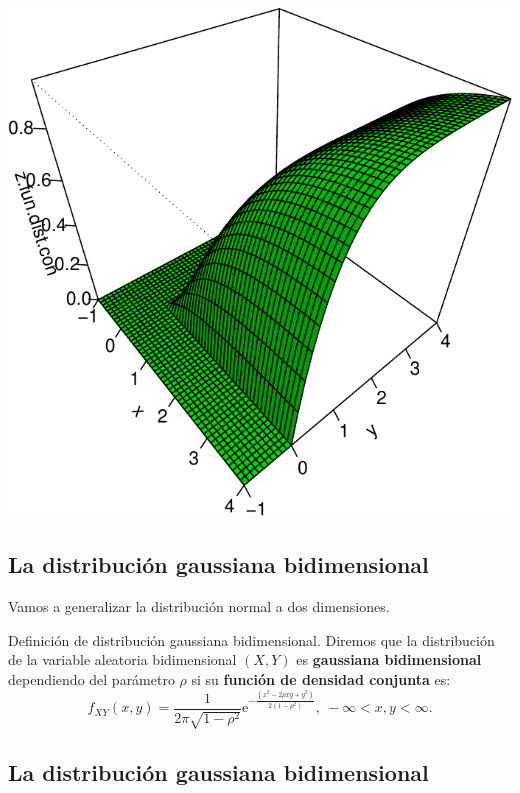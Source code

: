 \documentclass[]{book}
\begin{document}
\begin{center}\includegraphics{curso-probabilidad-udemy_files/figure-latex/unnamed-chunk-137-1} \end{center}

\hypertarget{la-distribuciuxf3n-gaussiana-bidimensional}{%
\subsection{La distribución gaussiana bidimensional}\label{la-distribuciuxf3n-gaussiana-bidimensional}}

Vamos a generalizar la distribución normal a dos dimensiones.

Definición de distribución gaussiana bidimensional.
Diremos que la distribución de la variable aleatoria bidimensional \((X,Y)\) es \textbf{gaussiana bidimensional} dependiendo del parámetro \(\rho\) si su \textbf{función de densidad conjunta} es:
\[
f_{XY}(x,y)=\frac{1}{2\pi\sqrt{1-\rho^2}}\mathrm{e}^{-\frac{(x^2-2\rho xy+y^2)}{2(1-\rho^2)}},\ -\infty <x,y<\infty.
\]

\hypertarget{la-distribuciuxf3n-gaussiana-bidimensional-1}{%
\subsection{La distribución gaussiana bidimensional}\label{la-distribuciuxf3n-gaussiana-bidimensional-1}}
\end{document}
